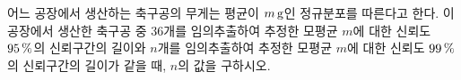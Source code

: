 어느 공장에서 생산하는 축구공의 무게는 평균이 $m\mkern3mu \mathrm{g}$인 정규분포를 따른다고 한다. 이 공장에서 생산한 축구공 중 36개를 임의추출하여 추정한 모평균 $m$에 대한 신뢰도 $95\mkern3mu \%$의 신뢰구간의 길이와 $n$개를 임의추출하여 추정한 모평균 $m$에 대한 신뢰도 $99\mkern3mu \%$의 신뢰구간의 길이가 같을 때, $n$의 값을 구하시오. 
